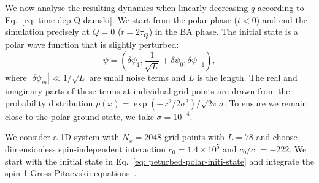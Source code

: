 We now analyse the resulting dynamics when linearly decreasing \( q \) according
to Eq.~\eqref{eq: time-dep-Q-damski}.
We start from the polar phase (\( t < 0 \)) and end the simulation precisely at
\( Q = 0 \) (\( t=2\tau_Q \)) in the BA phase.
The initial state is a polar wave function that is slightly perturbed:
\begin{equation}
    \psi = \left(\delta\psi_1, \frac{1}{\sqrt{L}} + \delta\psi_0,
    \delta\psi_{-1}\right),
    \label{eq: peturbed-polar-initi-state}
\end{equation}
where \( |\delta\psi_m| \ll 1 / \sqrt{L} \) are small noise terms and \( L \) is
the length.
The real and imaginary parts of these terms at individual grid points are drawn
from the probability distribution
\( p(x) = \exp(-x^2/2\sigma^2)/\sqrt{2\pi}\sigma \).
To ensure we remain close to the polar ground state, we take
\( \sigma=10^{-4} \).

We consider a 1D system with \(N_x = 2048\) grid points with \(L=78\) and
choose dimensionless spin-independent interaction \(c_0=1.4\times10^5\) and
\(c_0/c_1 = -222\).
We start with the initial state in Eq.~\eqref{eq: peturbed-polar-initi-state}
and integrate the spin-1 Gross-Pitaevskii equations~\cite{Symes2016}.

